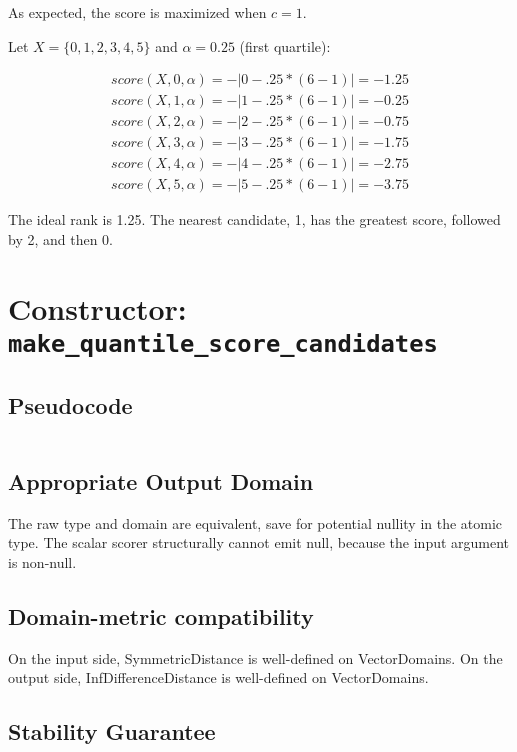 As expected, the score is maximized when $c = 1$.

Let $X = \{0,1,2,3,4,5\}$ and $\alpha = 0.25$ (first quartile):

\begin{align*}
    score(X, 0, \alpha) = -|0 - .25 * (6 - 1)| = -1.25 \\
    score(X, 1, \alpha) = -|1 - .25 * (6 - 1)| = -0.25 \\
    score(X, 2, \alpha) = -|2 - .25 * (6 - 1)| = -0.75 \\
    score(X, 3, \alpha) = -|3 - .25 * (6 - 1)| = -1.75 \\
    score(X, 4, \alpha) = -|4 - .25 * (6 - 1)| = -2.75 \\
    score(X, 5, \alpha) = -|5 - .25 * (6 - 1)| = -3.75
\end{align*}

The ideal rank is 1.25. The nearest candidate, 1, has the greatest score, followed by 2, and then 0. 

\section{Constructor: \texttt{make\_quantile\_score\_candidates}}

\subsection{Pseudocode}
\label{sec:python-pseudocode}
\inputminted{python}{./pseudocode/make_quantile_score_candidates.py}

\subsection{Appropriate Output Domain}
\label{sec:approp-output-domain}
The raw type and domain are equivalent, save for potential nullity in the atomic type. 
The scalar scorer structurally cannot emit null, because the input argument is non-null.

\subsection{Domain-metric compatibility}
On the input side, SymmetricDistance is well-defined on VectorDomains. 
On the output side, InfDifferenceDistance is well-defined on VectorDomains.

\subsection{Stability Guarantee}

